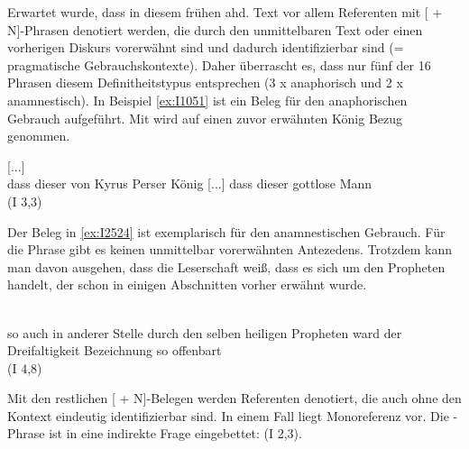Erwartet wurde, dass in diesem frühen ahd. Text vor allem Referenten mit [ + N]-Phrasen denotiert werden, die durch den unmittelbaren Text oder einen vorherigen Diskurs vorerwähnt sind und dadurch identifizierbar sind (= pragmatische Gebrauchskontexte). Daher überrascht es, dass nur fünf der 16 Phrasen diesem Definitheitstypus entsprechen (3 x anaphorisch und 2 x anamnestisch). In Beispiel \ref{ex:I1051} ist ein Beleg für den  anaphorischen Gebrauch aufgeführt. Mit  wird auf einen  zuvor erwähnten König Bezug genommen.  

%

\begin{exe}
\ex \label{ex:I1051} \gll  {}       [...]     \\
{dass} {dieser} {von} {Kyrus} {Perser} {König} [...] {dass} {dieser} {gottlose} {Mann} \\
\glt   {} (I 3,3)
\end{exe}

Der Beleg in \ref{ex:I2524} ist exemplarisch für den anamnestischen Gebrauch. Für die Phrase  gibt es keinen unmittelbar vorerwähnten Antezedens. Trotzdem kann man davon ausgehen, dass die Leserschaft weiß, dass es sich um den Propheten handelt, der schon in einigen Abschnitten vorher erwähnt wurde.
%

\begin{exe}
\ex \label{ex:I2524} \gll {}                 \\
{so} {auch} {in} {anderer} {Stelle} {durch} {den} {selben} {heiligen} {Propheten} {ward} {der} {Dreifaltigkeit} {Bezeichnung} {so} {offenbart} \\
\glt   {} (I 4,8)
\end{exe}

Mit den restlichen [ + N]-Belegen werden Referenten denotiert, die auch ohne den Kontext eindeutig identifizierbar sind. In einem Fall liegt Monoreferenz vor. Die -Phrase ist in eine indirekte Frage eingebettet:   (I 2,3). 

